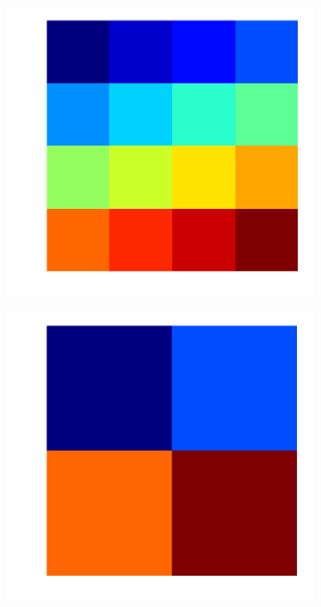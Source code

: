 \begin{figure}
	\centering
	\begin{subfigure}{0.32\textwidth}
		\includegraphics[width=\textwidth]{fig/other/rebin1}
		\caption{}
		\label{fig:rebin1}
	\end{subfigure}
	\hfill
		\begin{subfigure}{0.32\textwidth}
		\includegraphics[width=\textwidth]{fig/other/rebin3}

\end{subfigure}
\end{figure}
